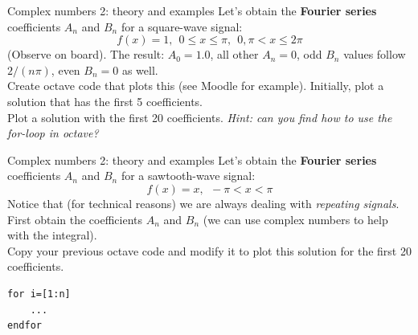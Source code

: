 \documentclass{beamer}
\begin{document}
\begin{frame}{Complex numbers 2: theory and examples}
Let's obtain the \alert{\textbf{Fourier series}} coefficients $A_n$ and $B_n$ for a square-wave signal:
\begin{equation}
f(x) = 1, ~~ 0 \leq x \leq \pi, ~~ 0,  \pi < x \leq 2\pi 
\end{equation}
(Observe on board).  The result: $A_0 = 1.0$, all other $A_n = 0$, odd $B_n$ values follow $2/(n\pi)$, even $B_n = 0$ as well. \\ \vspace{0.5cm}
Create octave code that plots this (see Moodle for example).  Initially, plot a solution that has the first 5 coefficients. \\ \vspace{0.5cm}
\alert{Plot a solution with the first 20 coefficients.}  \textit{Hint: can you find how to use the for-loop in octave?}
\end{frame}

\begin{frame}[fragile]{Complex numbers 2: theory and examples}
Let's obtain the \alert{\textbf{Fourier series}} coefficients $A_n$ and $B_n$ for a sawtooth-wave signal:
\begin{equation}
f(x) = x, ~~ -\pi < x < \pi
\end{equation}
Notice that (for technical reasons) we are always dealing with \textit{repeating signals}.
First obtain the coefficients $A_n$ and $B_n$ (we can use complex numbers to help with the integral). \\ \vspace{0.5cm}
\alert{Copy your previous octave code and modify it to plot this solution for the first 20 coefficients.}
\begin{verbatim}
for i=[1:n]
    ...
endfor
\end{verbatim}
\end{frame}
\end{document}
